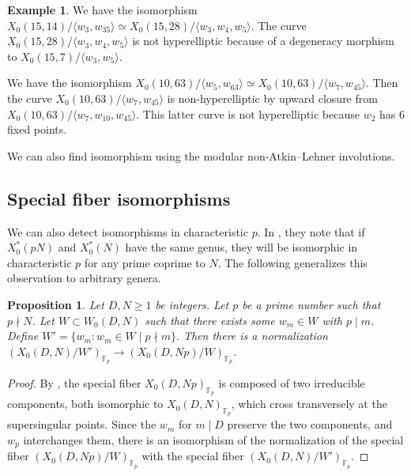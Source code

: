 \documentclass[12pt]{amsart}
\newcommand{\F}{\mathbb{F}}
\newcommand{\notdiv}{\nmid}
\numberwithin{equation}{subsection}
\theoremstyle{plain}\newtheorem{ithm}{Theorem}
\theoremstyle{plain}\newtheorem{iprop}[ithm]{Proposition}
\newtheorem{proposition}[equation]{Proposition}
\theoremstyle{definition}
\newtheorem{example}[equation]{Example}
\theoremstyle{remark}
\newcommand{\Curve}[2]{X_0({#1},{#2})} %
\newcommand{\ALfull}[2]{W_0({#1},{#2})} %
\begin{document}
\begin{example}
We have the isomorphism $\Curve{15}{14} / \langle w_3, w_{35} \rangle \simeq   \Curve{15}{28} / \langle w_{3}, w_4, w_5 \rangle $. The curve $\Curve{15}{28} / \langle w_{3}, w_4, w_5 \rangle  $ is not hyperelliptic because of a degeneracy morphism to $\Curve{15}{7}/ \langle w_3, w_5 \rangle$.

We have the isomorphism  $\Curve{10}{63}/\langle w_{5}, w_{63} \rangle \simeq \Curve{10}{63}/\langle w_7, w_{45} \rangle$. Then the curve $\Curve{10}{63}/\langle w_7, w_{45} \rangle$ is non-hyperelliptic by upward closure from $\Curve{10}{63}/ \langle w_7, w_{10}, w_{45} \rangle$. This latter curve is not hyperelliptic because $w_2$ has $6$ fixed points. 
\end{example}

We can also find isomorphism using the modular non-Atkin--Lehner involutions.


 \subsection{Special fiber isomorphisms}
 \label{sec:specialfiber}

We can also detect isomorphisms in characteristic $p$.
In \cite[Proposition~1]{HH96}, 
they note that if $X_0^*(pN)$ and $X_0^*(N)$ have the same genus, they will be isomorphic in characteristic $p$ for any prime coprime to $N$. 
The following generalizes this observation  to arbitrary genera.
 \begin{proposition}
 \label{prop:specialfiber}
 Let $D, N \geq 1$ be integers. 
Let $p$ be a prime number such that $p \nmid N$.
Let $W\subset \ALfull{D}{N}$ such that there exists some $w_m \in W$ with $p \mid m$.
Define $W' = \{ w_m : w_m \in W \mid p \notdiv m\}.$
Then there is a normalization $(\Curve{D}{N}/W')_{\F_p} \to (\Curve{D}{Np}/W)_{\F_p}$. 
\end{proposition}

\begin{proof}
By \cite[Theorem 4.7(v)]{Buzzard}, the special fiber $\Curve{D}{Np}_{\F_p}$ is composed of two irreducible components, both isomorphic to $\Curve{D}{N}_{\F_p}$, which cross transversely at the supersingular points. Since the $w_m$ for $m \mid D$ preserve the two components, and $w_p$ interchanges them,  
there is an isomorphism of the normalization of the special fiber $(\Curve{D}{Np}/W)_{\F_p}$ with the special fiber $(\Curve{D}{N}/W')_{\F_p}$.
\end{proof}
\end{document}
